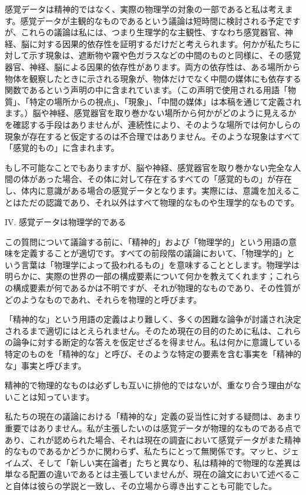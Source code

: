 \documentclass[a4paper,11pt,openany]{ltjsbook}
\begin{document}
感覚データは精神的ではなく、実際の物理学の対象の一部であると私は考えます。感覚データが主観的なものであるという議論は短時間に検討される予定ですが、これらの議論は私には、つまり生理学的な主観性、すなわち感覚器官、神経、脳に対する因果的依存性を証明するだけだと考えられます。何かが私たちに対して示す現象は、遮断物や霧や色ガラスなどの中間のものと同様に、その感覚器官、神経、脳による因果的依存性があります。両方の依存性は、ある場所から物体を観察したときに示される現象が、物体だけでなく中間の媒体にも依存する関数であるという声明の中に含まれています。（この声明で使用される用語「物質」、「特定の場所からの視点」、「現象」、「中間の媒体」は本稿を通じて定義されます。）脳や神経、感覚器官を取り巻かない場所から何かがどのように見えるかを確認する手段はありませんが、連続性により、そのような場所では何かしらの現象が存在すると仮定するのは不合理ではありません。そのような現象はすべて「感覚的もの」に含まれます。

もし不可能なことでもありますが、脳や神経、感覚器官を取り巻かない完全な人間の体があった場合、その体に対して存在するすべての「感覚的もの」が存在し、体内に意識がある場合の感覚データとなります。実際には、意識を加えることはただの認識であり、それ以外はすべて物理的なものや生理学的なものです。

IV. 感覚データは物理学的である

この質問について議論する前に、「精神的」および「物理学的」という用語の意味を定義することが適切です。すべての前段階の議論において、「物理学的」という言葉は「物理学によって扱われるもの」を意味することとします。物理学は明らかに、実際の世界の一部の構成要素について何かを教えてくれます；これらの構成要素が何であるかは不明ですが、それが物理的なものであり、その性質がどのようなものであれ、それらを物理的と呼びます。


「精神的な」という用語の定義はより難しく、多くの困難な論争が討議され決定されるまで適切にはとえられません。そのため現在の目的のために私は、これらの論争に対する断定的な答えを仮定せざるを得ません。私は何かに意識している特定のものを「精神的な」と呼び、そのような特定の要素を含む事実を「精神的な」事実と呼びます。

精神的で物理的なものは必ずしも互いに排他的ではないが、重なり合う理由がないことは知っています。

私たちの現在の議論における「精神的な」定義の妥当性に対する疑問は、あまり重要ではありません。私が主張したいのは感覚データが物理的なものである点であり、これが認められた場合、それは現在の調査において感覚データがまた精神的なものであるかどうかに関わらず、私たちにとって無関係です。マッヒ、ジェイムズ、そして「新しい実在論者」たちと異なり、私は精神的で物理的な差異は単なる配置の違いであるとは主張していませんが、現在の論文において述べること自体は彼らの学説と一致し、その立場から導き出すことも可能でした。
\end{document}
